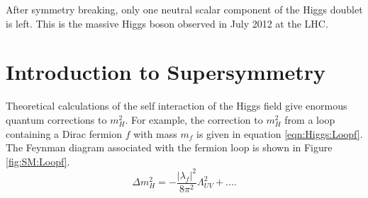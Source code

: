 \indent After symmetry breaking, only one neutral scalar component of the Higgs doublet is left.  This is the massive Higgs boson observed in July 2012 at the LHC.  \\

\section{Introduction to Supersymmetry}
\label{Theory:QFT}


\indent Theoretical calculations of the self interaction of the Higgs field give enormous quantum corrections to $m_H^2$.\cite{MartinSUSY}  For example, the correction to $m_H^2$ from a loop containing a Dirac fermion $f$ with mass $m_f$ is given in equation \ref{eqn:Higgs:Loopf}.  The Feynman diagram associated with the fermion loop is shown in Figure \ref{fig:SM:Loopf}. \\

\begin{equation}
\label{eqn:Higgs:Loopf}
\Delta m_H^2 = - \frac{|\lambda_f|^2}{8\pi^2}\Lambda^2_{UV} + ....
\end{equation}

